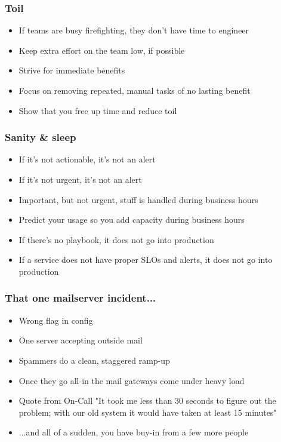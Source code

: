 \documentclass[t]{beamer}
\begin{document}
\begin{frame}
	\frametitle{Toil}
	\begin{itemize}
		\item If teams are busy firefighting, they don't have time to engineer
		\item Keep extra effort on the team low, if possible
		\item Strive for immediate benefits
		\item Focus on removing repeated, manual tasks of no lasting benefit
		\item Show that you free up time and reduce toil
	\end{itemize}
\end{frame}

\begin{frame}
	\frametitle{Sanity \& sleep}
	\begin{itemize}
		\item If it's not actionable, it's not an alert
		\item If it's not urgent, it's not an alert
		\item Important, but not urgent, stuff is handled during business hours
		\item Predict your usage so you add capacity during business hours
		\item If there's no playbook, it does not go into production
		\item If a service does not have proper SLOs and alerts, it does not go into production
	\end{itemize}
\end{frame}

\begin{frame}
	\frametitle{That one mailserver incident...}
	\begin{itemize}
		\item Wrong flag in config
		\item One server accepting outside mail
		\item Spammers do a clean, staggered ramp-up
		\item Once they go all-in the mail gateways come under heavy load
		\item Quote from On-Call "It took me less than 30 seconds to figure out the problem; with our old system it would have taken at least 15 minutes"
		\item ...and all of a sudden, you have buy-in from a few more people
	\end{itemize}
\end{frame}
\end{document}
